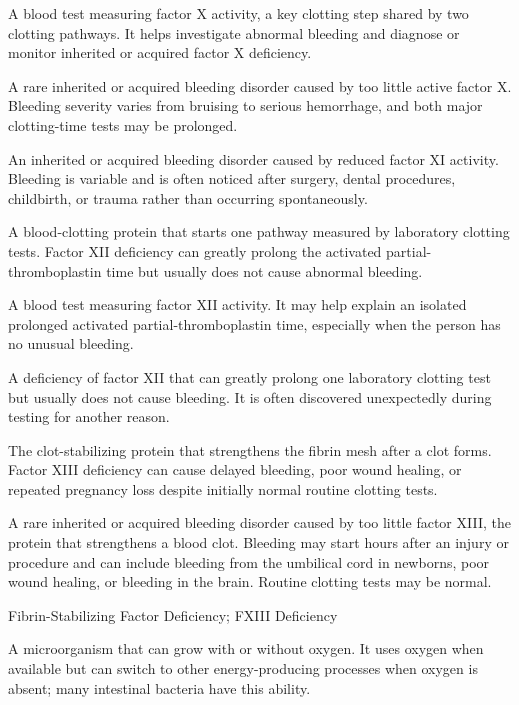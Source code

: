  A blood test measuring factor X activity, a key clotting step shared by two clotting pathways. It helps investigate abnormal bleeding and diagnose or monitor inherited or acquired factor X deficiency.

 A rare inherited or acquired bleeding disorder caused by too little active factor X. Bleeding severity varies from bruising to serious hemorrhage, and both major clotting-time tests may be prolonged.

 An inherited or acquired bleeding disorder caused by reduced factor XI activity. Bleeding is variable and is often noticed after surgery, dental procedures, childbirth, or trauma rather than occurring spontaneously.

 A blood-clotting protein that starts one pathway measured by laboratory clotting tests. Factor XII deficiency can greatly prolong the activated partial-thromboplastin time but usually does not cause abnormal bleeding.

 A blood test measuring factor XII activity. It may help explain an isolated prolonged activated partial-thromboplastin time, especially when the person has no unusual bleeding.

 A deficiency of factor XII that can greatly prolong one laboratory clotting test but usually does not cause bleeding. It is often discovered unexpectedly during testing for another reason.

 The clot-stabilizing protein that strengthens the fibrin mesh after a clot forms. Factor XIII deficiency can cause delayed bleeding, poor wound healing, or repeated pregnancy loss despite initially normal routine clotting tests.

 A rare inherited or acquired bleeding disorder caused by too little factor XIII, the protein that strengthens a blood clot. Bleeding may start hours after an injury or procedure and can include bleeding from the umbilical cord in newborns, poor wound healing, or bleeding in the brain. Routine clotting tests may be normal.

\synonyms
Fibrin-Stabilizing Factor Deficiency; FXIII Deficiency

 A microorganism that can grow with or without oxygen. It uses oxygen when available but can switch to other energy-producing processes when oxygen is absent; many intestinal bacteria have this ability.

